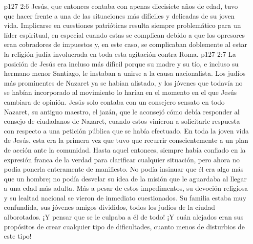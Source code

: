 \vs p127 2:6 Jesús, que entonces contaba con apenas diecisiete años de edad, tuvo que hacer frente a una de las situaciones más difíciles y delicadas de su joven vida. Implicarse en cuestiones patrióticas resulta siempre problemático para un líder espiritual, en especial cuando estas se complican debido a que los opresores eran cobradores de impuestos y, en este caso, se complicaban doblemente al estar la religión judía involucrada en toda esta agitación contra Roma.
\vs p127 2:7 La posición de Jesús era incluso más difícil porque su madre y su tío, e incluso su hermano menor Santiago, le instaban a unirse a la causa nacionalista. Los judíos más prominentes de Nazaret ya se habían alistado, y los jóvenes que todavía no se habían incorporado al movimiento lo harían en el momento en el que Jesús cambiara de opinión. Jesús solo contaba con un consejero sensato en todo Nazaret, su antiguo maestro, el jazán, que le aconsejó cómo debía responder al consejo de ciudadanos de Nazaret, cuando estos vinieron a solicitarle respuesta con respecto a una petición pública que se había efectuado. En toda la joven vida de Jesús, esta era la primera vez que tuvo que recurrir conscientemente a un plan de acción ante la comunidad. Hasta aquel entonces, siempre había confiado en la expresión franca de la verdad para clarificar cualquier situación, pero ahora no podía ponerla enteramente de manifiesto. No podía insinuar que él era algo más que un hombre; no podía desvelar su idea de la misión que le aguardaba al llegar a una edad más adulta. Más a pesar de estos impedimentos, su devoción religiosa y su lealtad nacional se vieron de inmediato cuestionados. Su familia estaba muy confundida, sus jóvenes amigos divididos, todos los judíos de la ciudad alborotados. ¡Y pensar que se le culpaba a él de todo! ¡Y cuán alejados eran sus propósitos de crear cualquier tipo de dificultades, cuanto menos de disturbios de este tipo!
